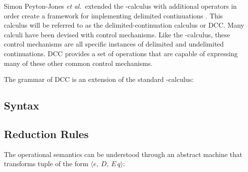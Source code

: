
  Simon Peyton-Jones \textit{et al.}\ extended the \lam-calculus with additional operators in order create a framework for implementing delimited continuations \cite{JonesDS07}. This calculus will be referred to as the delimited-continuation calculus or DCC. Many calculi have been devised with control mechanisms. Like the \lmu-calculus, these control mechanisms are all specific instances of delimited and undelimited continuations. DCC provides a set of operations that are capable of expressing many of these other common control mechanisms.

  The grammar of DCC is an extension of the standard \lam-calculus:

  \subsection{Syntax}
  \begin{figure}[!h]
  \end{figure}

  \subsection{Reduction Rules}
  The operational semantics can be understood through an abstract machine that transforms tuple of the form $\langle e,\ D,\ E\, q \rangle$:

